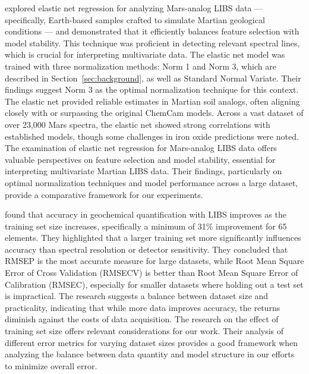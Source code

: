 \citeauthor{bai_application_2023} explored elastic net regression for analyzing Mars-analog LIBS data --- specifically, Earth-based samples crafted to simulate Martian geological conditions --- and demonstrated that it efficiently balances feature selection with model stability.
This technique was proficient in detecting relevant spectral lines, which is crucial for interpreting multivariate data.
The elastic net model was trained with three normalization methods: Norm 1 and Norm 3, which are described in Section~\ref{sec:background}, as well as Standard Normal Variate. 
Their findings suggest Norm 3 as the optimal normalization technique for this context.
The elastic net provided reliable  estimates in Martian soil analogs, often aligning closely with or surpassing the original ChemCam models.
Across a vast dataset of over 23,000 Mars spectra, the elastic net showed strong correlations with established models, though some challenges in iron oxide predictions were noted\cite{bai_application_2023}.
The examination of elastic net regression for Mars-analog LIBS data offers valuable perspectives on feature selection and model stability, essential for interpreting multivariate Martian LIBS data. Their findings, particularly on optimal normalization techniques and model performance across a large dataset, provide a comparative framework for our experiments.

\citeauthor{dyar_effect_2021} found that accuracy in geochemical quantification with LIBS improves as the training set size increases, specifically a minimum of 31\% improvement for 65 elements.
They highlighted that a larger training set more significantly influences accuracy than spectral resolution or detector sensitivity.
They concluded that RMSEP is the most accurate measure for large datasets, while Root Mean Square Error of Cross Validation (RMSECV) is better than Root Mean Square Error of Calibration (RMSEC), especially for smaller datasets where holding out a test set is impractical.
The research suggests a balance between dataset size and practicality, indicating that while more data improves accuracy, the returns diminish against the costs of data acquisition\cite{dyar_effect_2021}.
The research on the effect of training set size offers relevant considerations for our work. Their analysis of different error metrics for varying dataset sizes provides a good framework when analyzing the balance between data quantity and model structure in our efforts to minimize overall error.

